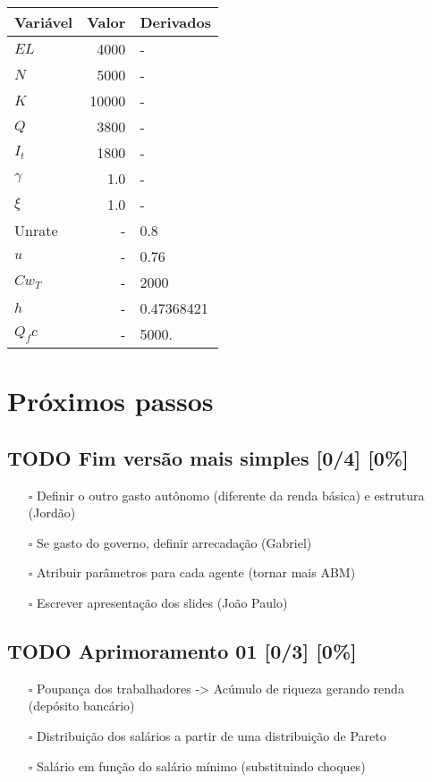 \documentclass[11pt]{article}
\begin{document}
\begin{center}
\begin{tabular}{lrl}
Variável & Valor & Derivados\\
\hline
\(EL\) & 4000 & -\\
\(N\) & 5000 & -\\
\(K\) & 10000 & -\\
\(Q\) & 3800 & -\\
\(I_t\) & 1800 & -\\
\(\gamma\) & 1.0 & -\\
\(\xi\) & 1.0 & -\\
\hline
Unrate & - & 0.8\\
\(u\) & - & 0.76\\
\(Cw_T\) & - & 2000\\
\(h\) & - & 0.47368421\\
\(Q_fc\) & - & 5000.\\
\end{tabular}
\end{center}

\section{Próximos passos}
\label{sec:org4aa4552}

\subsection{{\bfseries\sffamily TODO} Fim versão mais simples [0/4] [0\%]}
\label{sec:org0e1e256}
\begin{itemize}
\item[{$\square$}] Definir o outro gasto autônomo (diferente da renda básica) e estrutura (Jordão)
\item[{$\square$}] Se gasto do governo, definir arrecadação (Gabriel)
\item[{$\square$}] Atribuir parâmetros para cada agente (tornar mais ABM)
\item[{$\square$}] Escrever apresentação dos slides (João Paulo)
\end{itemize}

\subsection{{\bfseries\sffamily TODO} Aprimoramento 01 [0/3] [0\%]}
\label{sec:org4823717}
\begin{itemize}
\item[{$\square$}] Poupança dos trabalhadores -> Acúmulo de riqueza gerando renda (depósito bancário)
\item[{$\square$}] Distribuição dos salários a partir de uma distribuição de Pareto
\item[{$\square$}] Salário em função do salário mínimo (substituindo choques)
\end{itemize}
\end{document}
